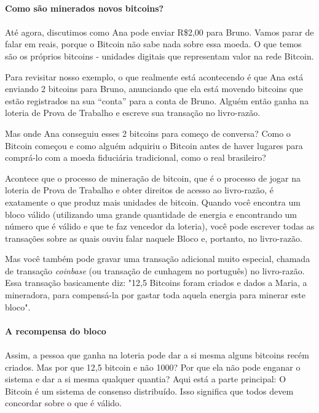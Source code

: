 \paragraph{Como são minerados novos bitcoins?}
\paragraph{}

Até agora, discutimos como Ana pode enviar R\$2,00 para Bruno. Vamos parar de falar em reais, porque o Bitcoin não sabe nada sobre essa moeda. O que temos são os próprios bitcoins - unidades digitais que representam valor na rede Bitcoin.

Para revisitar nosso exemplo, o que realmente está acontecendo é que Ana está enviando 2 bitcoins para Bruno, anunciando que ela está movendo bitcoins que estão registrados na sua “conta” para a conta de Bruno. Alguém então ganha na loteria de Prova de Trabalho e escreve sua transação no livro-razão.

Mas onde Ana conseguiu esses 2 bitcoins para começo de conversa? Como o Bitcoin começou e como alguém adquiriu o Bitcoin antes de haver lugares para comprá-lo com a moeda fiduciária tradicional, como o real brasileiro?

Acontece que o processo de mineração de bitcoin, que é o processo de jogar na loteria de Prova de Trabalho e obter direitos de acesso ao livro-razão, é exatamente o que produz mais unidades de bitcoin. Quando você encontra um bloco válido (utilizando uma grande quantidade de energia e encontrando um número que é válido e que te faz vencedor da loteria), você pode escrever todas as transações sobre as quais ouviu falar naquele Bloco e, portanto, no livro-razão.

Mas você também pode gravar uma transação adicional muito especial, chamada de transação \textit{coinbase} (ou transação de cunhagem no português) no livro-razão. Essa transação basicamente diz: "12,5 Bitcoins foram criados e dados a Maria, a mineradora, para compensá-la por gastar toda aquela energia para minerar este bloco".

\paragraph{A recompensa do bloco}
\paragraph{}

Assim, a pessoa que ganha na loteria pode dar a si mesma alguns bitcoins recém criados. Mas por que 12,5 bitcoin e não 1000? Por que ela não pode enganar o sistema e dar a si mesma qualquer quantia? Aqui está a parte principal: O Bitcoin é um sistema de consenso distribuído. Isso significa que todos devem concordar sobre o que é válido.

